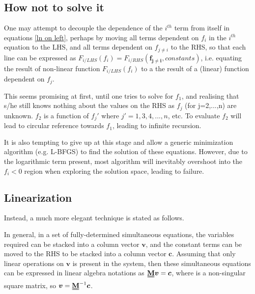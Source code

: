 \documentclass[a4paper, 12pt]{article}
\newcommand{\matr}[1]{\uuline{\bf{#1}}}
\newcommand{\ve}[1]{\boldsymbol{#1}}
\begin{document}
\subsection{How not to solve it}\label{dead-ends}

One may attempt to decouple the dependence of the $i^{th}$ term from itself in equations \ref{ln on left},
perhaps by moving all terms dependent on $f_i$ in the $i^{th}$ equation to the LHS,
and all terms dependent on $f_{j\neq i}$ to the RHS,
so that each line can be expressed as $F_{i/LHS}(f_i) = F_{i/RHS} (\ve{f_{j\neq i}}, constants)$,
i.e. equating the result of non-linear function $F_{i/LHS}(f_i)$ to a the result of a (linear) function dependent on $f_j$. 

This seems promising at first, until one tries to solve for $f_1$, and realising that s/he still knows nothing about the values on the RHS as $f_j$ (for j=2,...,n) are unknown. $f_2$ is a function of $f_j'$ where $j'=1,3,4,...,n$, etc. To evaluate $f_2$ will lead to circular reference towards $f_1$, leading to infinite recursion.

It is also tempting to give up at this stage and allow a generic minimization algorithm (e.g. L-BFGS) to find the solution of these equations. However, due to the logarithmic term present, most algorithm will inevitably overshoot into the $f_i<0$ region when exploring the solution space, leading to failure.

\subsection{Linearization} \label{linearization}
Instead, a much more elegant technique is stated as follows.

In general, in a set of fully-determined simultaneous equations, the variables required can be stacked into a column vector $\ve{v}$, and the constant terms can be moved to the RHS to be stacked into a column vector $\ve{c}$. Assuming that only linear operations on $\ve{v}$ is present in the system, then these simultaneous equations can be expressed in linear algebra notations as $\matr{M}\ve{v}=\ve{c}$, where \matr{M} is a non-singular square matrix, so $\ve{v}= \matr{M}^{-1}\ve{c}$.
\end{document}
